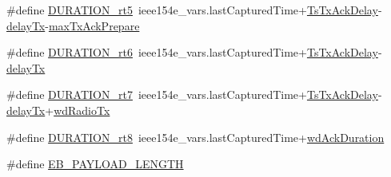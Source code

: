 \begin{DoxyCompactItemize}
$$\item 
\#define \hyperlink{group___i_e_e_e802154_e_ga7d70a4688cb8f913e2545b6d5a1617ce}{D\+U\+R\+A\+T\+I\+O\+N\+\_\+rt5}~ieee154e\+\_\+vars.\+last\+Captured\+Time+\hyperlink{group___i_e_e_e802154_e_gga6f324daf81dbfabfb2f9ed976c3d3296a6f33719a945ad997ed4c0d9976b9e7c1}{Ts\+Tx\+Ack\+Delay}-\/\hyperlink{group___i_e_e_e802154_e_gga6f324daf81dbfabfb2f9ed976c3d3296a73cb4977d53fe31fbc54ae289b79e84c}{delay\+Tx}-\/\hyperlink{group___i_e_e_e802154_e_gga6f324daf81dbfabfb2f9ed976c3d3296a6b97819e933d54ac16e153fab8c10b88}{max\+Tx\+Ack\+Prepare}
\item 
\#define \hyperlink{group___i_e_e_e802154_e_gac4b49c57750ff7e8dae6c26f9c8801fd}{D\+U\+R\+A\+T\+I\+O\+N\+\_\+rt6}~ieee154e\+\_\+vars.\+last\+Captured\+Time+\hyperlink{group___i_e_e_e802154_e_gga6f324daf81dbfabfb2f9ed976c3d3296a6f33719a945ad997ed4c0d9976b9e7c1}{Ts\+Tx\+Ack\+Delay}-\/\hyperlink{group___i_e_e_e802154_e_gga6f324daf81dbfabfb2f9ed976c3d3296a73cb4977d53fe31fbc54ae289b79e84c}{delay\+Tx}
\item 
\#define \hyperlink{group___i_e_e_e802154_e_gafd59b8c389fce37f8fabc8da6e05b96b}{D\+U\+R\+A\+T\+I\+O\+N\+\_\+rt7}~ieee154e\+\_\+vars.\+last\+Captured\+Time+\hyperlink{group___i_e_e_e802154_e_gga6f324daf81dbfabfb2f9ed976c3d3296a6f33719a945ad997ed4c0d9976b9e7c1}{Ts\+Tx\+Ack\+Delay}-\/\hyperlink{group___i_e_e_e802154_e_gga6f324daf81dbfabfb2f9ed976c3d3296a73cb4977d53fe31fbc54ae289b79e84c}{delay\+Tx}+\hyperlink{group___i_e_e_e802154_e_gga6f324daf81dbfabfb2f9ed976c3d3296a683f4596ce2344e0d4ab2bcbac0aa542}{wd\+Radio\+Tx}
\item 
\#define \hyperlink{group___i_e_e_e802154_e_ga364757b1318ad578c3643eb588188e2b}{D\+U\+R\+A\+T\+I\+O\+N\+\_\+rt8}~ieee154e\+\_\+vars.\+last\+Captured\+Time+\hyperlink{group___i_e_e_e802154_e_gga6f324daf81dbfabfb2f9ed976c3d3296a543381e64abcefce4288e06940071f94}{wd\+Ack\+Duration}
\item 
\#define \hyperlink{group___i_e_e_e802154_e_gab0b67b83e90b9aa6ad5a65d50f82fc70}{E\+B\+\_\+\+P\+A\+Y\+L\+O\+A\+D\+\_\+\+L\+E\+N\+G\+TH}
\end{DoxyCompactItemize}
